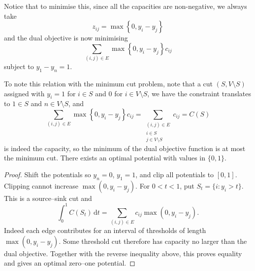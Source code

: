 \documentclass[11pt]{article}
\theoremstyle{definition}
\theoremstyle{remark}
\newcommand{\pqty}[1]{\left(#1\right)}
\newcommand{\Bqty}[1]{\left\{#1\right\}}
\begin{document}
Notice that to minimise this, since all the capacities are non-negative, we always take
\[
    z_{ij} = \max \Bqty{0, y_i - y_j}
\]
and the dual objective is now minimising
\[
    \sum_{\pqty{i, j} \in E} \max \Bqty{0, y_i - y_j} c_{ij}
\]
subject to \(y_1 - y_n = 1\).

To note this relation with the minimum cut problem, note that a cut \(\pqty{S, V \setminus S}\) assigned with \(y_i = 1\) for \(i \in S\) and \(0\) for \(i \in V \setminus S\), we have the constraint translates to \(1 \in S\) and \(n \in V \setminus S\), and
\[
    \sum_{\pqty{i, j} \in E} \max \Bqty{0, y_i - y_j} c_{ij} = \sum_{\substack{\pqty{i, j} \in E \\ i \in S \\ j \in V \setminus S}} c_{ij} = C\pqty{S}
\]
is indeed the capacity, so the minimum of the dual objective function is at most the minimum cut. There exists an optimal potential with values in \(\{0,1\}\).
\begin{proof}
Shift the potentials so \(y_n=0\), \(y_1=1\), and clip all potentials to \([0,1]\).
Clipping cannot increase \(\max(0,y_i-y_j)\). For \(0<t<1\), put
\(S_t=\{i:y_i>t\}\). This is a source--sink cut and
\[
\int_0^1 C(S_t)\,\mathrm{d}t
=\sum_{(i,j)\in E}c_{ij}\max(0,y_i-y_j).
\]
Indeed each edge contributes for an interval of thresholds of length
\(\max(0,y_i-y_j)\). Some threshold cut therefore has capacity no larger than
the dual objective. Together with the reverse inequality above, this proves equality
and gives an optimal zero--one potential.
\end{proof}
\end{document}
